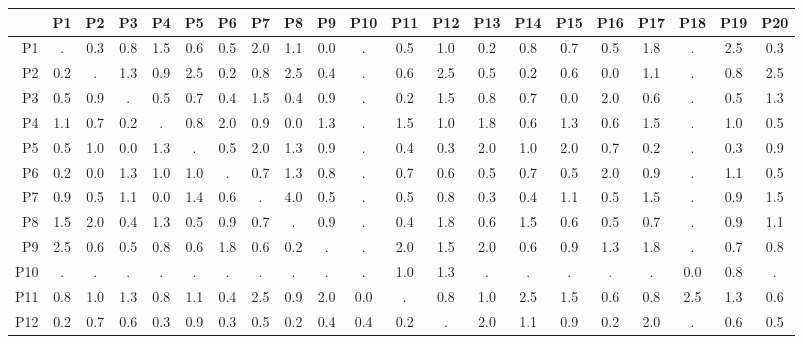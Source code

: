 \documentclass {report}
\begin{document}
    \begin{landscape}
    \begin{table}[p]
            \label{tab:setup1}
            \centering
            \setlength{\tabcolsep}{5pt}
            \begin{tabular}{r|cccccccccccccccccccc}
                &       P1  & P2  & P3  & P4  & P5  & P6  &  P7 &   P8  &	P9	&	P10	&	P11	&	P12	&	P13	&	P14	&	P15	&	P16	&	P17	&	P18	&	P19	&	P20  \\ \hline
                P1	&	 .  & 0.3 & 0.8 & 1.5 & 0.6 & 0.5 & 2.0 & 1.1 & 0.0 &  .  & 0.5 & 1.0 & 0.2 & 0.8 & 0.7 & 0.5 & 1.8 &  .  & 2.5 & 0.3	\\
                P2	&	0.2 &  .  & 1.3 & 0.9 & 2.5 & 0.2 & 0.8 & 2.5 & 0.4 &  .  & 0.6 & 2.5 & 0.5 & 0.2 & 0.6 & 0.0 & 1.1 &  .  & 0.8 & 2.5	\\
                P3	&	0.5 & 0.9 &  .  & 0.5 & 0.7 & 0.4 & 1.5 & 0.4 & 0.9 &  .  & 0.2 & 1.5 & 0.8 & 0.7 & 0.0 & 2.0 & 0.6 &  .  & 0.5 & 1.3	\\
                P4	&	1.1 & 0.7 & 0.2 &  .  & 0.8 & 2.0 & 0.9 & 0.0 & 1.3 &  .  & 1.5 & 1.0 & 1.8 & 0.6 & 1.3 & 0.6 & 1.5 &  .  & 1.0 & 0.5	\\
                P5	&	0.5 & 1.0 & 0.0 & 1.3 &  .  & 0.5 & 2.0 & 1.3 & 0.9 &  .  & 0.4 & 0.3 & 2.0 & 1.0 & 2.0 & 0.7 & 0.2 &  .  & 0.3 & 0.9	\\
                P6	&	0.2 & 0.0 & 1.3 & 1.0 & 1.0 &  .  & 0.7 & 1.3 & 0.8 &  .  & 0.7 & 0.6 & 0.5 & 0.7 & 0.5 & 2.0 & 0.9 &  .  & 1.1 & 0.5	\\
                P7	&	0.9 & 0.5 & 1.1 & 0.0 & 1.4 & 0.6 &  .  & 4.0 & 0.5 &  .  & 0.5 & 0.8 & 0.3 & 0.4 & 1.1 & 0.5 & 1.5 &  .  & 0.9 & 1.5	\\
                P8	&	1.5 & 2.0 & 0.4 & 1.3 & 0.5 & 0.9 & 0.7 &  .  & 0.9 &  .  & 0.4 & 1.8 & 0.6 & 1.5 & 0.6 & 0.5 & 0.7 &  .  & 0.9 & 1.1	\\
                P9	&	2.5 & 0.6 & 0.5 & 0.8 & 0.6 & 1.8 & 0.6 & 0.2 &  .  &  .  & 2.0 & 1.5 & 2.0 & 0.6 & 0.9 & 1.3 & 1.8 &  .  & 0.7 & 0.8	\\
                P10	&	 .  &  .  &  .  &  .  &  .  &  .  &  .  &  .  &  .  &  .  & 1.0 & 1.3 &  .  &  .  &  .  &  .  &  .  & 0.0 & 0.8 &  . 	\\
                P11	&	0.8 & 1.0 & 1.3 & 0.8 & 1.1 & 0.4 & 2.5 & 0.9 & 2.0 & 0.0 &  .  & 0.8 & 1.0 & 2.5 & 1.5 & 0.6 & 0.8 & 2.5 & 1.3 & 0.6	\\
                P12	&	0.2 & 0.7 & 0.6 & 0.3 & 0.9 & 0.3 & 0.5 & 0.2 & 0.4 & 0.4 & 0.2 &  .  & 2.0 & 1.1 & 0.9 & 0.2 & 2.0 &  .  & 0.6 & 0.5	\\

\end{tabular}
\end{table}
\end{landscape}
\end{document}
